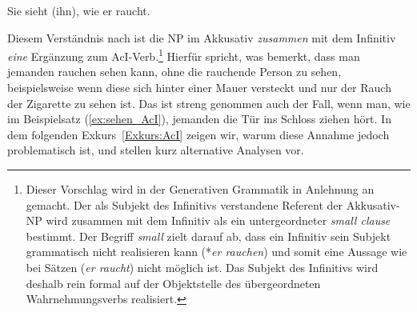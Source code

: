 \ea \label{ea:sieht_aci_wie} Sie sieht (ihn), wie er raucht.
\z 

Diesem Verständnis nach ist die NP im Akkusativ \textit{zusammen} mit dem Infinitiv \textit{eine} Ergänzung zum AcI-Verb.\footnote{Dieser Vorschlag wird in der Generativen Grammatik in Anlehnung an \citet[106–177]{Chomsky1981} gemacht. Der als Subjekt des Infinitivs verstandene Referent der Akkusativ-NP wird zusammen mit dem Infinitiv als ein untergeordneter \textit{small clause} bestimmt. Der Begriff \textit{small} zielt darauf ab, dass ein Infinitiv sein Subjekt grammatisch nicht realisieren kann (*\textit{er rauchen}) und somit eine Aussage wie bei  Sätzen (\textit{er raucht}) nicht möglich ist. Das Subjekt des Infinitivs wird deshalb rein formal auf der Objektstelle des übergeordneten Wahrnehmungsverbs realisiert.} Hierfür spricht, was \citet[382]{MuellerLehrbuch4} bemerkt, dass man jemanden rauchen sehen kann, ohne die rauchende Person zu sehen, beispielsweise wenn diese sich hinter einer Mauer versteckt und nur der Rauch der Zigarette zu sehen ist. Das ist streng genommen auch der Fall, wenn man, wie im Beispielsatz (\ref{ex:sehen_AcI}), jemanden die Tür ins Schloss ziehen hört. In dem folgenden Exkurs~\ref{Exkurs:AcI} zeigen wir, warum diese Annahme jedoch problematisch ist, und stellen kurz alternative Analysen vor.

